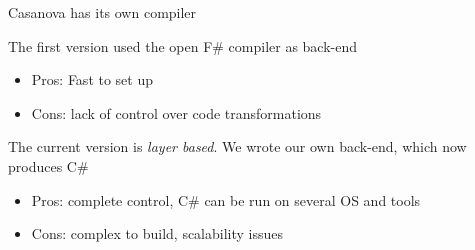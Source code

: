 \documentclass{beamer}
\begin{document}
\begin{slide}{
\item Casanova has its own compiler 
\item The first version used the open F\# compiler as back-end
\begin{itemize}
\item Pros: Fast to set up
\item Cons: lack of control over code transformations
\end{itemize}
\item The current version is \textit{layer based}. We wrote our own back-end, which now produces C\#
\begin{itemize}
	\item Pros: complete control, C\# can be run on several OS and tools
	\item Cons: complex to build, scalability issues
\end{itemize}
}\end{slide}
\end{document}

